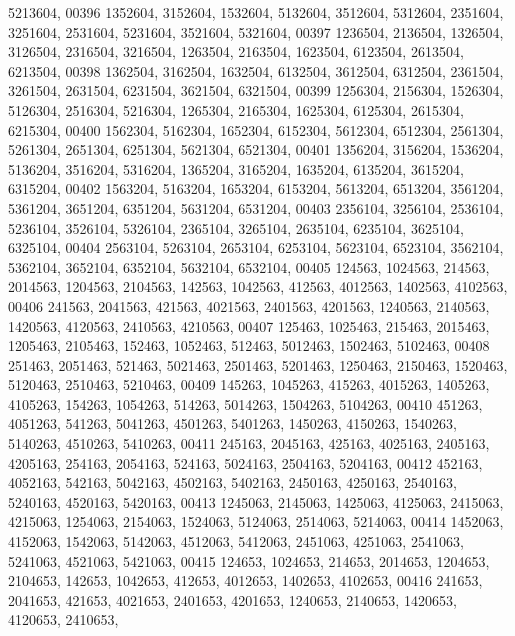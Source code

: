 \begin{DoxyCode}
      5213604,
00396       1352604, 3152604, 1532604, 5132604, 3512604, 5312604, 2351604, 3251604, 2531604, 5231604, 3521604, 
      5321604,
00397       1236504, 2136504, 1326504, 3126504, 2316504, 3216504, 1263504, 2163504, 1623504, 6123504, 2613504, 
      6213504,
00398       1362504, 3162504, 1632504, 6132504, 3612504, 6312504, 2361504, 3261504, 2631504, 6231504, 3621504, 
      6321504,
00399       1256304, 2156304, 1526304, 5126304, 2516304, 5216304, 1265304, 2165304, 1625304, 6125304, 2615304, 
      6215304,
00400       1562304, 5162304, 1652304, 6152304, 5612304, 6512304, 2561304, 5261304, 2651304, 6251304, 5621304, 
      6521304,
00401       1356204, 3156204, 1536204, 5136204, 3516204, 5316204, 1365204, 3165204, 1635204, 6135204, 3615204, 
      6315204,
00402       1563204, 5163204, 1653204, 6153204, 5613204, 6513204, 3561204, 5361204, 3651204, 6351204, 5631204, 
      6531204,
00403       2356104, 3256104, 2536104, 5236104, 3526104, 5326104, 2365104, 3265104, 2635104, 6235104, 3625104, 
      6325104,
00404       2563104, 5263104, 2653104, 6253104, 5623104, 6523104, 3562104, 5362104, 3652104, 6352104, 5632104, 
      6532104,
00405        124563, 1024563,  214563, 2014563, 1204563, 2104563,  142563, 1042563,  412563, 4012563, 1402563, 
      4102563,
00406        241563, 2041563,  421563, 4021563, 2401563, 4201563, 1240563, 2140563, 1420563, 4120563, 2410563, 
      4210563,
00407        125463, 1025463,  215463, 2015463, 1205463, 2105463,  152463, 1052463,  512463, 5012463, 1502463, 
      5102463,
00408        251463, 2051463,  521463, 5021463, 2501463, 5201463, 1250463, 2150463, 1520463, 5120463, 2510463, 
      5210463,
00409        145263, 1045263,  415263, 4015263, 1405263, 4105263,  154263, 1054263,  514263, 5014263, 1504263, 
      5104263,
00410        451263, 4051263,  541263, 5041263, 4501263, 5401263, 1450263, 4150263, 1540263, 5140263, 4510263, 
      5410263,
00411        245163, 2045163,  425163, 4025163, 2405163, 4205163,  254163, 2054163,  524163, 5024163, 2504163, 
      5204163,
00412        452163, 4052163,  542163, 5042163, 4502163, 5402163, 2450163, 4250163, 2540163, 5240163, 4520163, 
      5420163,
00413       1245063, 2145063, 1425063, 4125063, 2415063, 4215063, 1254063, 2154063, 1524063, 5124063, 2514063, 
      5214063,
00414       1452063, 4152063, 1542063, 5142063, 4512063, 5412063, 2451063, 4251063, 2541063, 5241063, 4521063, 
      5421063,
00415        124653, 1024653,  214653, 2014653, 1204653, 2104653,  142653, 1042653,  412653, 4012653, 1402653, 
      4102653,
00416        241653, 2041653,  421653, 4021653, 2401653, 4201653, 1240653, 2140653, 1420653, 4120653, 2410653, 

\end{DoxyCode}
